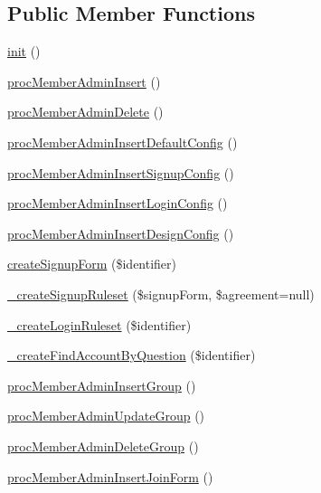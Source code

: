 \subsection*{Public Member Functions}
\begin{DoxyCompactItemize}
\item 
\hyperlink{classmemberAdminController_a6c8b7afa8a1e9de99069b819d30d4f4f}{init} ()
\item 
\hyperlink{classmemberAdminController_a1e89340738ee22bd5af9de8521076aa0}{proc\+Member\+Admin\+Insert} ()
\item 
\hyperlink{classmemberAdminController_abbab5de7009e650ce1ca96d335e9b7be}{proc\+Member\+Admin\+Delete} ()
\item 
\hyperlink{classmemberAdminController_aed6b9a31f228437805b53841455ebeed}{proc\+Member\+Admin\+Insert\+Default\+Config} ()
\item 
\hyperlink{classmemberAdminController_a9e134d115f4fa383b20ec2b7c8cae444}{proc\+Member\+Admin\+Insert\+Signup\+Config} ()
\item 
\hyperlink{classmemberAdminController_a8145cf05118cd5728eb93066efce3fa8}{proc\+Member\+Admin\+Insert\+Login\+Config} ()
\item 
\hyperlink{classmemberAdminController_a95ca46d0090220adba228592e8e09aa5}{proc\+Member\+Admin\+Insert\+Design\+Config} ()
\item 
\hyperlink{classmemberAdminController_a5169e7a00b203b65f8be3efb491937a1}{create\+Signup\+Form} (\$identifier)
\item 
\hyperlink{classmemberAdminController_ae032ea2bb44c28bfa7e04a4d5e357040}{\+\_\+create\+Signup\+Ruleset} (\$signup\+Form, \$agreement=null)
\item 
\hyperlink{classmemberAdminController_ad9823f9a79e8a26a39d912bcd888e301}{\+\_\+create\+Login\+Ruleset} (\$identifier)
\item 
\hyperlink{classmemberAdminController_a6e227f85ce71ac94e57e37ecc395613f}{\+\_\+create\+Find\+Account\+By\+Question} (\$identifier)
\item 
\hyperlink{classmemberAdminController_a3ae8c66d424cd909998fbcd9f257c809}{proc\+Member\+Admin\+Insert\+Group} ()
\item 
\hyperlink{classmemberAdminController_a8d14fe0f7df63dbce5cc50d61d452635}{proc\+Member\+Admin\+Update\+Group} ()
\item 
\hyperlink{classmemberAdminController_a8ee81f4eedf5dc094b5a21a9a1200849}{proc\+Member\+Admin\+Delete\+Group} ()
\item 
\hyperlink{classmemberAdminController_a6b1e886dc7e03b2bd91be9f79c9813ad}{proc\+Member\+Admin\+Insert\+Join\+Form} ()

\end{DoxyCompactItemize}
